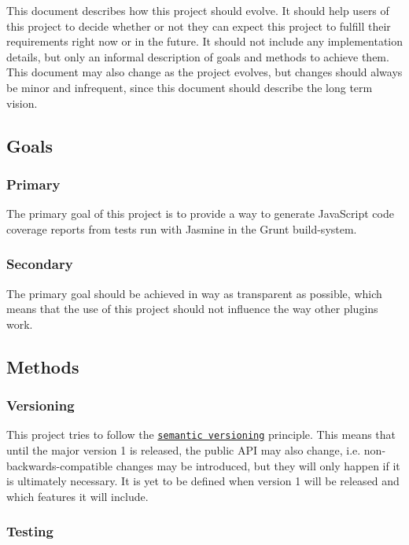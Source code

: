 This document describes how this project should evolve. It should help users of this project to decide whether or not they can expect this project to fulfill their requirements right now or in the future. It should not include any implementation details, but only an informal description of goals and methods to achieve them. This document may also change as the project evolves, but changes should always be minor and infrequent, since this document should describe the long term vision.

\subsection*{Goals}

\subsubsection*{Primary}

The primary goal of this project is to provide a way to generate Java\+Script code coverage reports from tests run with {\ttfamily Jasmine} in the {\ttfamily Grunt} build-\/system.

\subsubsection*{Secondary}

The primary goal should be achieved in way as transparent as possible, which means that the use of this project should not influence the way other plugins work.

\subsection*{Methods}

\subsubsection*{Versioning}

This project tries to follow the \href{http://semver.org/}{\tt semantic versioning} principle. This means that until the major version 1 is released, the public A\+P\+I may also change, i.\+e. non-\/backwards-\/compatible changes may be introduced, but they will only happen if it is ultimately necessary. It is yet to be defined when version 1 will be released and which features it will include.

\subsubsection*{Testing}

